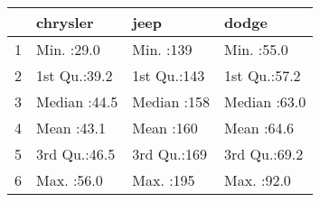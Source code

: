 \begin{tabular}{rlll}
  \hline
 &    chrysler &      jeep &     dodge \\ 
  \hline
1 & Min.   :29.0   & Min.   :139   & Min.   :55.0   \\ 
  2 & 1st Qu.:39.2   & 1st Qu.:143   & 1st Qu.:57.2   \\ 
  3 & Median :44.5   & Median :158   & Median :63.0   \\ 
  4 & Mean   :43.1   & Mean   :160   & Mean   :64.6   \\ 
  5 & 3rd Qu.:46.5   & 3rd Qu.:169   & 3rd Qu.:69.2   \\ 
  6 & Max.   :56.0   & Max.   :195   & Max.   :92.0   \\ 
   \hline
\end{tabular}
